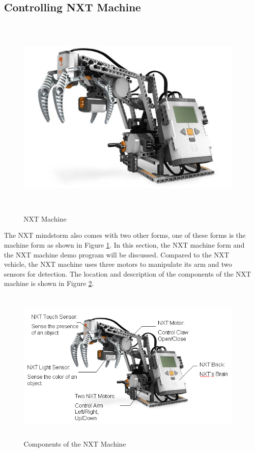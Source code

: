 \documentclass[11pt]{article}
\begin{document}
\subsection{Controlling NXT Machine}
\begin{figure}[h]
  \begin{center}
    \includegraphics[height=4in]{figure/mindstorm/NXT_machine.png}
    \caption{NXT Machine\label{fig_NXT_machine}}
  \end{center}
\end{figure}
\noindent
The NXT mindstorm also comes with two other forms, one of these forms is the machine form as shown in Figure
\ref{fig_NXT_machine}. In this section, the NXT machine form and the NXT machine demo program will be discussed.
Compared to the NXT vehicle, the NXT machine uses three motors to manipulate its arm and two sensors for detection.
The location and description of the components of the NXT machine is shown in Figure \ref{fig_NXT_machineMOD}.
\newpage
\begin{figure}[h]
  \begin{center}
      \includegraphics[height = 3in]{figure/mindstorm/NXT_machineMOD.png}
    \caption{Components of the NXT Machine\label{fig_NXT_machineMOD}}
  \end{center}
\end{figure}
\end{document}
